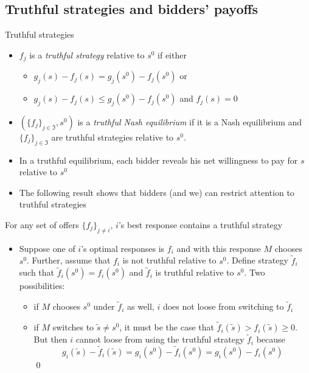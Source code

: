 \documentclass[11pt,english]{beamer}
\begin{document}
\subsection{Truthful strategies and bidders' payoffs}

\begin{frame}[allowframebreaks]{Truthful strategies}
  \begin{itemize}
  \item $f_j$ is a \emph{truthful strategy} relative to $s^0$ if either
    \begin{itemize}
    \item $g_j(s) - f_j(s) =g_j(s^0)-f_j(s^0)$ or
    \item $g_j(s) - f_j(s) \leq g_j(s^0)-f_j(s^0)$ and $f_j(s)=0$
    \end{itemize}
  \item $(\{f_j\}_{j \in \Im},s^0)$ is a \emph{truthful Nash
      equilibrium} if it is a Nash equilibrium and $\{f_j\}_{j \in
      \Im}$ are truthful strategies relative to $s^0$.
  \item In a truthful equilibrium, each bidder reveals his net
    willingness to pay for $s$ relative to $s^0$
  \item The following result shows that bidders (and we) can restrict
    attention to truthful strategies
  \end{itemize}
  \begin{theorem}
    For any set of offers $\{f_j\}_{j \neq i}$, $i$'s best response
    contains a truthful strategy
  \end{theorem}
  \begin{itemize}
  \item Suppose one of $i$'s optimal responses is $f_i$ and with this
    response $M$ chooses $s^0$. Further, assume that $f_i$ is not
    truthful relative to $s^0$. Define strategy $\tilde f_i$ such that
    $\tilde f_i(s^0) =f_i(s^0)$ and $\tilde f_i$ is truthful relative
    to $s^0$. Two possibilities:
    \begin{itemize}
    \item if $M$ chooses $s^0$ under $\tilde f_i$ as well, $i$ does
      not loose from switching to $\tilde f_i$
    \item if $M$ switches to $\tilde s \neq s^0$, it must be the case
      that $\tilde f_i(\tilde s) > f_i(\tilde s) \geq 0$. But then $i$
      cannot loose from using the truthful strategy $\tilde f_i$ because
      \begin{equation*}
        g_i(\tilde s)-\tilde f_i(\tilde s) = g_i(s^0)-\tilde f_i(s^0)
        = g_i(s^0) -f_i(s^0)
      \end{equation*} \qed
    \end{itemize}
  \end{itemize}
\end{frame}
\end{document}
